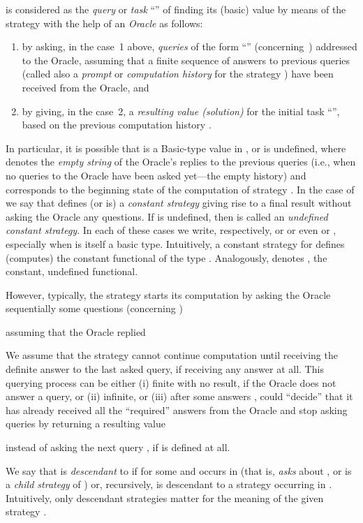 \documentclass[fleqn]{LMCS}
\theoremstyle{plain}\newtheorem{satz}[thm]{Satz}
\theoremstyle{plain}\newtheorem{hyp}[thm]{Hypothesis}
\theoremstyle{plain}\newtheorem{hyps}[thm]{Hypotheses}
\theoremstyle{definition}\newtheorem{note}[thm]{Note}
\newcommand{\?}{\mbox{?}}
\begin{document}
is considered as the \emph{query} or \emph{task} ``'' of finding its 
(basic) value by means of the strategy  with the help of an \emph{Oracle} as follows:
\begin{enumerate}[]
\item
by asking, in the case~1
above, 
{\em queries\/} of the form ``'' 
(concerning~) 
addressed to the Oracle,
assuming that a finite sequence of answers  
to previous queries 
(called also a \emph{prompt} or \emph{computation history} 
for the strategy ) 
have been
received from the Oracle, and 
\item
by giving,
in the case~2, a {\em resulting value (solution)\/} for the
initial task ``'', based on the previous computation history . 
\end{enumerate}
In particular, it is possible that
 is a Basic-type value in , 
or  is undefined, where
 denotes the \emph{empty string} of the Oracle's replies 
to the previous queries
(i.e., when no queries to the Oracle have been asked yet---the 
empty history) 
and 
corresponds to the beginning state of the computation of strategy .
In the case of  we say that   
defines (or is) a \emph{constant strategy\/} giving rise 
to a final result  without asking the Oracle any questions. 
If  is undefined, then  is called 
an {\em undefined constant strategy\/}. 
In each of these cases we write, respectively,
 or  or even
 or , especially when  is itself a basic type. 
Intuitively, a constant strategy  for 
 defines (computes) 
the constant functional  
of the type . Analogously,  denotes 
, the constant, 
undefined functional. 

However, typically, the strategy  starts its computation 
by asking the Oracle sequentially some questions  
(concerning ) 

assuming that the Oracle replied 

We assume that the strategy  cannot continue computation until 
receiving the definite answer to the last asked query, if receiving 
any answer at all. 
This querying process can be either 
(i) finite with no result, if the Oracle does not answer a query, or 
(ii) infinite, or (iii) after some answers ,  
 could ``decide'' that it has already received 
all the ``required'' answers from the Oracle and stop asking queries  
by returning a resulting value 

instead of asking the next query , 
if 
 is defined at all. 

 
We say that  is \emph{descendant} to  if 
 for some  
and  occurs in  
(that is,  \emph{asks} about , or  is a \emph{child strategy} of )
or, recursively,  is descendant to a strategy occurring in 
. Intuitively, only descendant strategies 
matter for the meaning of the given strategy . 
\end{document}
